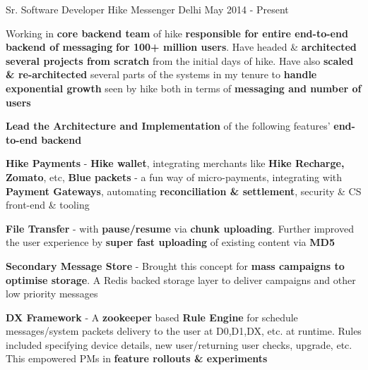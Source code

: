 
\begin{cventries}
  \cventry
    {Sr. Software Developer} %
    {Hike Messenger} %
    {Delhi} %
    {May 2014 - Present} %
    {
     \vspace{13pt}
      \begin{cvitems} %
        \item {Working in \textbf{core backend team} of hike \textbf{responsible for entire end-to-end backend of messaging} \textbf{for 100+ million users}. Have headed \& \textbf{architected several projects from scratch} from the initial days of hike. Have also \textbf{scaled \& re-architected} several parts of the systems in my tenure to \textbf{handle exponential growth} seen by hike both in terms of \textbf{messaging and number of users}}
		\item {\textbf{Lead the Architecture and Implementation} of the following features' \textbf{end-to-end backend}}
        \begin{cventries}
          \cventry
            {} %
            {} %
            {} %
            {} %
            {
             \vspace{-20pt}
              \begin{cvsubitems}
                \item {\textbf{Hike Payments} - \textbf{Hike wallet}, integrating merchants like \textbf{Hike Recharge, Zomato}, etc, \textbf{Blue packets} - a fun way of micro-payments, integrating with \textbf{Payment Gateways}, automating \textbf{reconciliation \& settlement}, security \& CS front-end \& tooling}
                \item {\textbf{File Transfer} - with \textbf{pause/resume} via \textbf{chunk uploading}. Further improved the user experience by \textbf{super fast uploading} of existing content via \textbf{MD5}}
		        \item {\textbf{Secondary Message Store} - Brought this concept for \textbf{mass campaigns to optimise storage}. A Redis backed storage layer to deliver campaigns and other low priority messages}
		        \item {\textbf{DX Framework} - A \textbf{zookeeper} based \textbf{Rule Engine} for schedule messages/system packets delivery to the user at D0,D1,DX, etc. at runtime. Rules included specifying device details, new user/returning user checks, upgrade, etc. This empowered PMs in \textbf{feature rollouts \& experiments}}

\end{cvsubitems}}
\end{cventries}
\end{cvitems}}
\end{cventries}
